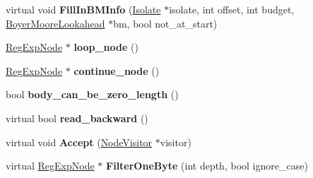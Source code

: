 \begin{DoxyCompactItemize}
\item 
virtual void {\bfseries Fill\+In\+B\+M\+Info} (\hyperlink{classv8_1_1internal_1_1_isolate}{Isolate} $\ast$isolate, int offset, int budget, \hyperlink{classv8_1_1internal_1_1_boyer_moore_lookahead}{Boyer\+Moore\+Lookahead} $\ast$bm, bool not\+\_\+at\+\_\+start)\hypertarget{classv8_1_1internal_1_1_loop_choice_node_a56ea5cf95196217fad30b03fd4acbbd0}{}\label{classv8_1_1internal_1_1_loop_choice_node_a56ea5cf95196217fad30b03fd4acbbd0}

\item 
\hyperlink{classv8_1_1internal_1_1_reg_exp_node}{Reg\+Exp\+Node} $\ast$ {\bfseries loop\+\_\+node} ()\hypertarget{classv8_1_1internal_1_1_loop_choice_node_ab7302af501d9e4fc180be3c3531c308a}{}\label{classv8_1_1internal_1_1_loop_choice_node_ab7302af501d9e4fc180be3c3531c308a}

\item 
\hyperlink{classv8_1_1internal_1_1_reg_exp_node}{Reg\+Exp\+Node} $\ast$ {\bfseries continue\+\_\+node} ()\hypertarget{classv8_1_1internal_1_1_loop_choice_node_a16806e7a3a040882b1d268c01127e96c}{}\label{classv8_1_1internal_1_1_loop_choice_node_a16806e7a3a040882b1d268c01127e96c}

\item 
bool {\bfseries body\+\_\+can\+\_\+be\+\_\+zero\+\_\+length} ()\hypertarget{classv8_1_1internal_1_1_loop_choice_node_a2f44790afa263a24910170fdf12e6076}{}\label{classv8_1_1internal_1_1_loop_choice_node_a2f44790afa263a24910170fdf12e6076}

\item 
virtual bool {\bfseries read\+\_\+backward} ()\hypertarget{classv8_1_1internal_1_1_loop_choice_node_a94c5246cccaf882154f72ef0bc996f2f}{}\label{classv8_1_1internal_1_1_loop_choice_node_a94c5246cccaf882154f72ef0bc996f2f}

\item 
virtual void {\bfseries Accept} (\hyperlink{classv8_1_1internal_1_1_node_visitor}{Node\+Visitor} $\ast$visitor)\hypertarget{classv8_1_1internal_1_1_loop_choice_node_aa5078b0084b7659910a67f79b905045a}{}\label{classv8_1_1internal_1_1_loop_choice_node_aa5078b0084b7659910a67f79b905045a}

\item 
virtual \hyperlink{classv8_1_1internal_1_1_reg_exp_node}{Reg\+Exp\+Node} $\ast$ {\bfseries Filter\+One\+Byte} (int depth, bool ignore\+\_\+case)\hypertarget{classv8_1_1internal_1_1_loop_choice_node_abd5ddb1dd9bd1429be112caba0bf1d39}{}\label{classv8_1_1internal_1_1_loop_choice_node_abd5ddb1dd9bd1429be112caba0bf1d39}

\end{DoxyCompactItemize}
